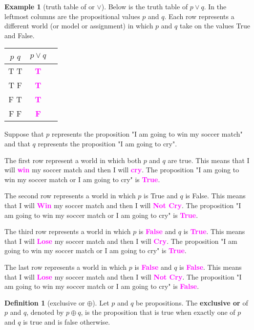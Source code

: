 \documentclass[letterpaper,10pt]{article}
\theoremstyle{plain}
\theoremstyle{definition}
\newtheorem{defn}[thm]{Definition}
\newtheorem{exmp}[thm]{Example}
\theoremstyle{remark}
\providecommand{\lor}{\ensuremath{\vee}}
\providecommand{\lxor}{\ensuremath{\oplus}}
\providecommand{\todo}[1]{\textcolor{magenta}{\textbf{#1}}}
\begin{document}
\begin{exmp}[truth table of or $\lor$]
Below is the truth table of $p \lor q$. In the leftmost columns are the propositional values $p$ and $q$. Each row represents a different world (or model or assignment) in which $p$ and $q$ take on the values True and False. 

\begin{center}
\begin{tabular}{ | c | c | c |} 
  \hline
 $p$ $q$ & $ p \lor q$ \\
 \hline
  T T & \todo{T} \\ 
  T F & \todo{T} \\ 
  F T & \todo{T} \\ 
  F F & \todo{F} \\ 
  \hline
\end{tabular}
\end{center}

Suppose that $p$ represents the proposition "I am going to win my soccer match" and that $q$ represents the proposition "I am going to cry".

The first row represent a world in which both $p$ and $q$ are true.
This means that I will \todo{win} my soccer match and then I will \todo{cry}. The proposition "I am going to win my soccer match or I am going to cry" is \todo{True}.

The second row represents a world in which $p$ is True and $q$ is False. This means that I will \todo{Win} my soccer match and then I will \todo{Not Cry}. The proposition "I am going to win my soccer match or I am going to cry" is \todo{True}.

The third row represents a world in which $p$ is \todo{False} and $q$ is \todo{True}. This means that I will \todo{Lose} my soccer match and then I will \todo{Cry}. The proposition "I am going to win my soccer match or I am going to cry" is \todo{True}.

The last row represents a world in which $p$ is \todo{False} and $q$ is \todo{False}. This means that I will \todo{Lose} my soccer match and then I will \todo{Not Cry}. The proposition "I am going to win my soccer match or I am going to cry" is \todo{False}.
\end{exmp}
\begin{defn}[exclusive or $\lxor$]
Let $p$ and $q$ be propositions. The \textbf{exclusive or} of $p$ and $q$, denoted by $p \lxor q$, is the proposition
that is true when exactly one of $p$ and $q$ is true and is false otherwise.
\end{defn}
\end{document}
